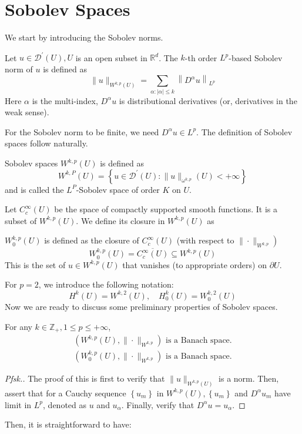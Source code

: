 \newpage
\section{Sobolev Spaces}
We start by introducing the Sobolev norms. 

\begin{definition}
 Let $u \in \mathcal{D}^{\prime}(U), U$ is an open subset in $\mathbb{R}^{d}$. The $k$-th order $L^{p}$-based Sobolev norm of $u$ is defined as
$$
\|u\|_{W^{k, p}(U)}=\sum_{\alpha:|\alpha| \leq k}\left\|D^{\alpha} u\right\|_{L^{p}}
$$
Here $\alpha$ is the multi-index, $D^{\alpha} u$ is distributional derivatives (or, derivatives in the weak sense).
\end{definition}
For the Sobolev norm to be finite, we need $D^{\alpha} u \in L^{p}$. The definition of Sobolev spaces follow naturally.

\begin{definition}
     Sobolev spaces $W^{k, p}(U)$ is defined as
    $$
    W^{k, P}(U)=\left\{u \in \mathcal{D}^{\prime}(U):\|u\|_{\omega^{k, p}}(U)<+\infty\right\}
    $$
    and is called the $L^{P}$-Sobolev space of order $K$ on $U .$

\end{definition}

Let $C_{c}^{\infty}(U)$ be the space of compactly supported smooth functions. It is a subset of $W^{k, p}(U)$. We define its closure in $W^{k, p}(U)$ as

\begin{definition}
[$(W_{0}^{k, p}(U)$] $ W_{0}^{k, p}(U)$ is defined as the closure of $C_{c}^{\infty}(U)$ (with respect to $\left.\|\cdot\|_{W^{k, p}}\right)$
    $$
    W_{0}^{k, p}(U)=\overline{C_{c}^{\infty}(U)} \subseteq W^{k, p}(U)
    $$
    This is the set of $u \in W^{k, p}(U)$ that vanishes (to appropriate orders) on $\partial U$.

\end{definition}
For $p=2$, we introduce the following notation:
$$
H^{k}(U)=W^{k, 2}(U), \quad H_{0}^{k}(U)=W_{0}^{k, 2}(U)
$$
Now we are ready to discuss some preliminary properties of Sobolev spaces. 

\begin{theorem}
 For any $k \in \mathbb{Z}_{+}, 1 \leq p \leq+\infty$,
\begin{align*}
    \left(W^{k, p}(U),\|\cdot\|_{W^{k, p}}\right) \text{ is a Banach space.}\\
    \left(W_{0}^{k, p}(U),\|\cdot\|_{W^{k, p}}\right) \text{ is a Banach space.}
\end{align*}
\end{theorem}
\begin{proof}[Pfsk.]
    The proof of this is first to verify that $\|u\|_{W^{k, p}(U)}$ is a norm. Then, assert that for a Cauchy sequence $\left\{u_{m}\right\}$ in $W^{k, p}(U),\left\{u_{m}\right\}$ and $D^{\alpha} u_{m}$ have limit in $L^{p}$, denoted as $u$ and $u_{\alpha}$. Finally, verify that $D^{\alpha} u=u_{\alpha}$.
\end{proof}
Then, it is straightforward to have:

